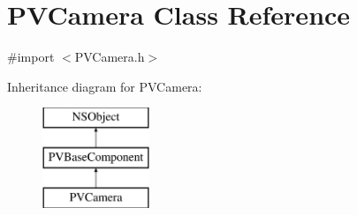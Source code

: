 \hypertarget{interface_p_v_camera}{}\section{P\+V\+Camera Class Reference}
\label{interface_p_v_camera}


{\ttfamily \#import $<$P\+V\+Camera.\+h$>$}

Inheritance diagram for P\+V\+Camera\+:\begin{figure}[H]
\begin{center}
\leavevmode
\includegraphics[height=3.000000cm]{interface_p_v_camera}
\end{center}
\end{figure}
